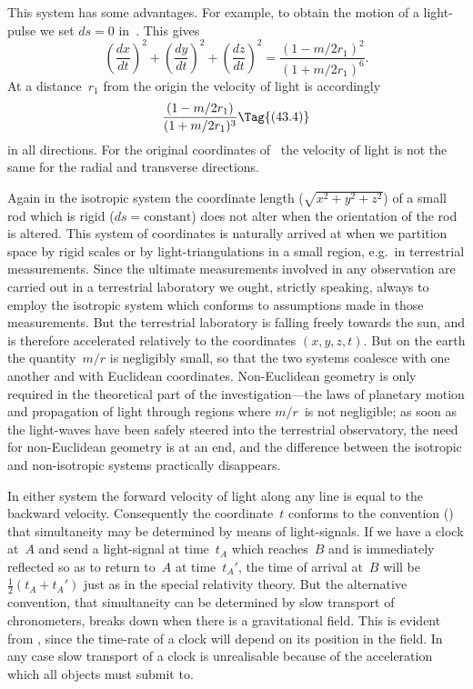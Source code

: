 \documentclass[12pt]{book}
\begin{document}
This system has some advantages. For example, to obtain the motion of
a light-pulse we set $ds = 0$ in~. This gives
\[
\left(\frac{dx}{dt}\right)^{2}
+ \left(\frac{dy}{dt}\right)^{2}
+ \left(\frac{dz}{dt}\right)^{2}
= \frac{(1 - m/2r_{1})^{2}}{(1 + m/2r_{1})^{6}}.
\]
At a distance~$r_{1}$ from the origin the velocity of light is accordingly
%
\[
\frac{(1 - m/2r_{1})}{(1 + m/2r_{1})^{3}}
\Tag{(43.4)}
\]
in all directions. For the original coordinates of~ the velocity of light is
not the same for the radial and transverse directions.

Again in the isotropic system the coordinate length ($\sqrt{x^{2} + y^{2} + z^{2}}$) of
a small rod which is rigid ($ds = \text{constant}$) does not alter when the orientation
of the rod is altered. This system of coordinates is naturally arrived at when
we partition space by rigid scales or by light-triangulations in a small region,
e.g.\ in terrestrial measurements. Since the ultimate measurements involved
in any observation are carried out in a terrestrial laboratory we ought, strictly
speaking, always to employ the isotropic system which conforms to assumptions
made in those measurements\footnotemark.\footnotetext
  {But the terrestrial laboratory is falling freely towards the sun, and is therefore accelerated
  relatively to the coordinates $(x, y, z, t)$.}
But on the earth the quantity~$m/r$ is negligibly
small, so that the two systems coalesce with one another and with Euclidean
coordinates. Non-Euclidean geometry is only required in the theoretical part
of the investigation---the laws of planetary motion and propagation of light
through regions where $m/r$~is not negligible; as soon as the light-waves have
been safely steered into the terrestrial observatory, the need for non-Euclidean
geometry is at an end, and the difference between the isotropic and non-isotropic
systems practically disappears.

In either system the forward velocity of light along any line is equal to
the backward velocity. Consequently the coordinate~$t$ conforms to the convention
() that simultaneity may be determined by means of light-signals.
If we have a clock at~$A$ and send a light-signal at time~$t_{A}$ which reaches~$B$
and is immediately reflected so as to return to~$A$ at time~$t_{A}'$, the time of arrival
at~$B$ will be $\frac{1}{2}(t_{A} + t_{A}')$ just as in the special relativity theory. But the alternative
convention, that simultaneity can be determined by slow transport of
chronometers, breaks down when there is a gravitational field. This is evident
from , since the time-rate of a clock will depend on its position in the field.
In any case slow transport of a clock is unrealisable because of the acceleration
which all objects must submit to.
\end{document}
